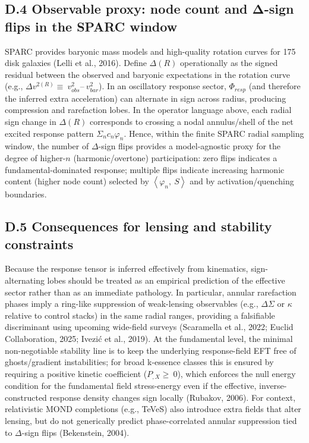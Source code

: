 \subsection{D.4 Observable proxy: node count and Δ-sign flips in the SPARC window}\label{d.4-observable-proxy-node-count-and-ux3b4-sign-flips-in-the-sparc-window}

SPARC provides baryonic mass models and high-quality rotation curves for 175 disk galaxies (Lelli et al., 2016). Define \(\Delta(R)\) operationally as the signed residual between the observed and baryonic expectations in the rotation curve (e.g., \(\Delta v^{2(R)} \equiv \ v_{obs}^{2}–\ v_{bar}^{2}\)). In an oscillatory response sector, \(\Phi_{resp}\) (and therefore the inferred extra acceleration) can alternate in sign across radius, producing compression and rarefaction lobes. In the operator language above, each radial sign change in \(\Delta(R)\) corresponds to crossing a nodal annulus/shell of the net excited response pattern \(\Sigma_{n}c_{n}\varphi_{n}\). Hence, within the finite SPARC radial sampling window, the number of \(\Delta\)-sign flips provides a model-agnostic proxy for the degree of higher-\(n\) (harmonic/overtone) participation: zero flips indicates a fundamental-dominated response; multiple flips indicate increasing harmonic content (higher node count) selected by \(\left\langle \varphi_{n},\ S \right\rangle\) and by activation/quenching boundaries.

\subsection{D.5 Consequences for lensing and stability constraints}\label{d.5-consequences-for-lensing-and-stability-constraints}

Because the response tensor is inferred effectively from kinematics, sign-alternating lobes should be treated as an empirical prediction of the effective sector rather than as an immediate pathology. In particular, annular rarefaction phases imply a ring-like suppression of weak-lensing observables (e.g., \(\Delta\Sigma\) or \(\kappa\) relative to control stacks) in the same radial ranges, providing a falsifiable discriminant using upcoming wide-field surveys (Scaramella et al., 2022; Euclid Collaboration, 2025; Ivezić et al., 2019). At the fundamental level, the minimal non-negotiable stability line is to keep the underlying response-field EFT free of ghosts/gradient instabilities; for broad k-essence classes this is ensured by requiring a positive kinetic coefficient (\(P_{,X} \geq \ 0\)), which enforces the null energy condition for the fundamental field stress-energy even if the effective, inverse-constructed response density changes sign locally (Rubakov, 2006). For context, relativistic MOND completions (e.g., TeVeS) also introduce extra fields that alter lensing, but do not generically predict phase-correlated annular suppression tied to \(\Delta\)-sign flips (Bekenstein, 2004).

